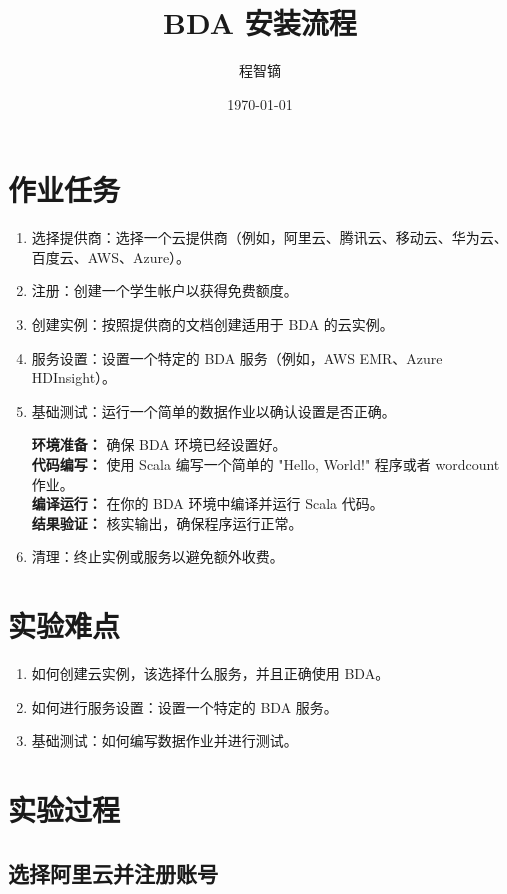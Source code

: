 \documentclass{article}
\title{BDA 安装流程}
\author{程智镝}
\date{\today}
\begin{document}
\maketitle

\section*{作业任务}
\begin{enumerate}
    \item 选择提供商：选择一个云提供商（例如，阿里云、腾讯云、移动云、华为云、百度云、AWS、Azure）。
    \item 注册：创建一个学生帐户以获得免费额度。
    \item 创建实例：按照提供商的文档创建适用于 BDA 的云实例。
    \item 服务设置：设置一个特定的 BDA 服务（例如，AWS EMR、Azure HDInsight）。
    \item 基础测试：运行一个简单的数据作业以确认设置是否正确。
    
    \textbf{环境准备：} 确保 BDA 环境已经设置好。\\
    \textbf{代码编写：} 使用 Scala 编写一个简单的 "Hello, World!" 程序或者 wordcount 作业。\\
    \textbf{编译运行：} 在你的 BDA 环境中编译并运行 Scala 代码。\\
    \textbf{结果验证：} 核实输出，确保程序运行正常。
    
    \item 清理：终止实例或服务以避免额外收费。
\end{enumerate}

\section*{实验难点}
\begin{enumerate}
    \item 如何创建云实例，该选择什么服务，并且正确使用 BDA。
    \item 如何进行服务设置：设置一个特定的 BDA 服务。
    \item 基础测试：如何编写数据作业并进行测试。
\end{enumerate}

\section*{实验过程}
\subsection*{选择阿里云并注册账号}
\end{document}
